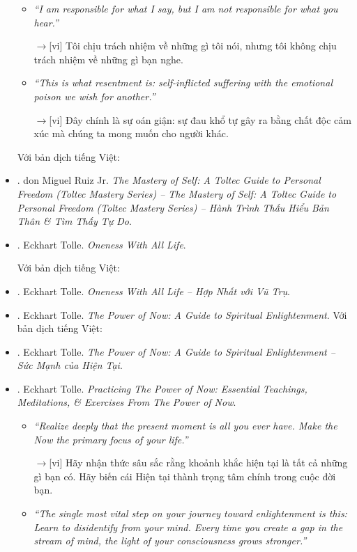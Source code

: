 \documentclass[12pt,oneside]{book}
\begin{document}
\begin{itemize}
\begin{itemize}
		\item {\it``I am responsible for what I say, but I am not responsible for what you hear.''}
		
		{\sf[en]$\to$[vi]} Tôi chịu trách nhiệm về những gì tôi nói, nhưng tôi không chịu trách nhiệm về những gì bạn nghe.
		
		\item {\it``This is what resentment is: self-inflicted suffering with the emotional poison we wish for another.''}
		
		{\sf[en]$\to$[vi]} Đây chính là sự oán giận: sự đau khổ tự gây ra bằng chất độc cảm xúc mà chúng ta mong muốn cho người khác.
	\end{itemize}
	Với bản dịch tiếng Việt:
	\item \cite{Ruiz_mastery_self}. {\sc don Miguel Ruiz Jr.} {\it The Mastery of Self: A Toltec Guide to Personal Freedom (Toltec Mastery Series) -- The Mastery of Self: A Toltec Guide to Personal Freedom (Toltec Mastery Series) -- Hành Trình Thấu Hiểu Bản Thân \& Tìm Thấy Tự Do}.
	\item \cite{Tolle_oneness}. {\sc Eckhart Tolle}. {\it Oneness With All Life}.
	
	Với bản dịch tiếng Việt:
	\item \cite{Tolle_oneness_VN}. {\sc Eckhart Tolle}. {\it Oneness With All Life -- Hợp Nhất với Vũ Trụ}.
	\item \cite{Tolle_now}. {\sc Eckhart Tolle}. {\it The Power of Now: A Guide to Spiritual Enlightenment}. Với bản dịch tiếng Việt:
	\item \cite{Tolle_now_VN}. {\sc Eckhart Tolle}. {\it The Power of Now: A Guide to Spiritual Enlightenment -- Sức Mạnh của Hiện Tại}.
	\item \cite{Tolle_practice_now}. {\sc Eckhart Tolle}. {\it Practicing The Power of Now: Essential Teachings, Meditations, \& Exercises From The Power of Now}.
	\begin{itemize}
		\item {\it``Realize deeply that the present moment is all you ever have. Make the Now the primary focus of your life.''}
		
		{\sf[en]$\to$[vi]} Hãy nhận thức sâu sắc rằng khoảnh khắc hiện tại là tất cả những gì bạn có. Hãy biến cái Hiện tại thành trọng tâm chính trong cuộc đời bạn.
		
		\item {\it``The single most vital step on your journey toward enlightenment is this: Learn to disidentify from your mind. Every time you create a gap in the stream of mind, the light of your consciousness grows stronger.''}
		

\end{itemize}
\end{itemize}
\end{document}
